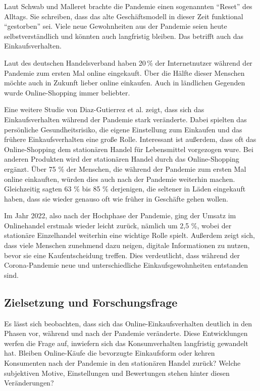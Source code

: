 Laut Schwab und Malleret brachte die Pandemie einen sogenannten \enquote{Reset} des Alltags. Sie schreiben, dass das alte Geschäftsmodell in dieser Zeit funktional \enquote{gestorben} sei. Viele neue Gewohnheiten aus der Pandemie seien heute selbstverständlich und könnten auch langfristig bleiben. Das betrifft auch das Einkaufsverhalten. 

Laut des deutschen Handelsverband haben 20 \% der Internetnutzer während der Pandemie zum ersten Mal online eingekauft. Über die Hälfte dieser Menschen möchte auch in Zukunft lieber online einkaufen. Auch in ländlichen Gegenden wurde Online-Shopping immer beliebter.

Eine weitere Studie von Diaz-Gutierrez et al. zeigt, dass sich das Einkaufsverhalten während der Pandemie stark veränderte. Dabei spielten das persönliche Gesundheitsrisiko, die eigene Einstellung zum Einkaufen und das frühere Einkaufsverhalten eine große Rolle. Interessant ist außerdem, dass oft das Online-Shopping dem stationären Handel für Lebensmittel vorgezogen wure. Bei anderen Produkten wird der stationären Handel durch das Online-Shopping ergänzt. Über 75 \% der Menschen, die während der Pandemie zum ersten Mal online einkauften, würden dies auch nach der Pandemie weiterhin machen. Gleichzeitig sagten 63 \% bis 85 \% derjenigen, die seltener in Läden eingekauft haben, dass sie wieder genauso oft wie früher in Geschäfte gehen wollen. 

Im Jahr 2022, also nach der Hochphase der Pandemie, ging der Umsatz im Onlinehandel erstmals wieder leicht zurück, nämlich um 2,5 \%, wobei der stationäre Einzelhandel weiterhin eine wichtige Rolle spielt. Außerdem zeigt sich, dass viele Menschen zunehmend dazu neigen, digitale Informationen zu nutzen, bevor sie eine Kaufentscheidung treffen. Dies verdeutlicht, dass während der Corona-Pandemie neue und unterschiedliche Einkaufsgewohnheiten entstanden sind. 

\subsection{Zielsetzung und Forschungsfrage}
Es lässt sich beobachten, dass sich das Online-Einkaufsverhalten deutlich in den Phasen vor, während und nach der Pandemie veränderte. Diese Entwicklungen werfen die Frage auf, inwiefern sich das Konsumverhalten langfristig gewandelt hat. Bleiben Online-Käufe die bevorzugte Einkaufsform oder kehren Konsumenten nach der Pandemie in den stationären Handel zurück? Welche subjektiven Motive, Einstellungen und Bewertungen stehen hinter diesen Veränderungen? 

